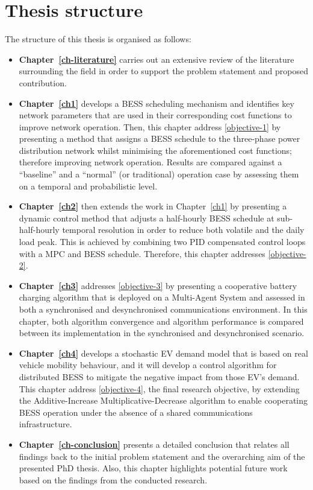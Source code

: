 \section{Thesis structure}
\label{ch-introduction:sec:thesis-structure}

The structure of this thesis is organised as follows:

\begin{itemize}
	\item
	\textbf{Chapter~\ref{ch-literature}} carries out an extensive review of the literature surrounding the field in order to support the problem statement and proposed contribution.
	\item
	\textbf{Chapter~\ref{ch1}} develops a BESS scheduling mechanism and identifies key network parameters that are used in their corresponding cost functions to improve network operation.
	Then, this chapter address \ref{objective-1} by presenting a method that assigns a BESS schedule to the three-phase power distribution network whilst minimising the aforementioned cost functions; therefore improving network operation.
	Results are compared against a ``baseline'' and a ``normal'' (or traditional) operation case by assessing them on a temporal and probabilistic level.
	\item
	\textbf{Chapter~\ref{ch2}} then extends the work in Chapter~\ref{ch1} by presenting a dynamic control method that adjusts a half-hourly BESS schedule at sub-half-hourly temporal resolution in order to reduce both volatile and the daily load peak.
	This is achieved by combining two PID compensated control loops with a MPC and BESS schedule.
	Therefore, this chapter addresses \ref{objective-2}.
	\item
	\textbf{Chapter~\ref{ch3}} addresses \ref{objective-3} by presenting a cooperative battery charging algorithm that is deployed on a Multi-Agent System and assessed in both a synchronised and desynchronised communications environment.
	In this chapter, both algorithm convergence and algorithm performance is compared between its implementation in the synchronised and desynchronised scenario.
	\item
	\textbf{Chapter~\ref{ch4}} develops a stochastic EV demand model that is based on real vehicle mobility behaviour, and it will develop a control algorithm for distributed BESS to mitigate the negative impact from those EV's demand.
	This chapter address \ref{objective-4}, the final research objective, by extending the Additive-Increase Multiplicative-Decrease algorithm to enable cooperating BESS operation under the absence of a shared communications infrastructure.
	\item
	\textbf{Chapter~\ref{ch-conclusion}} presents a detailed conclusion that relates all findings back to the initial problem statement and the overarching aim of the presented PhD thesis.
	Also, this chapter highlights potential future work based on the findings from the conducted research.
\end{itemize}